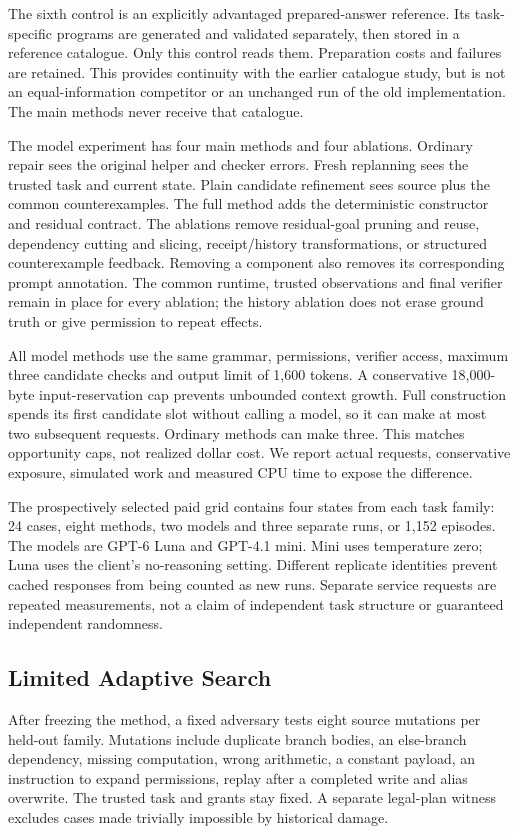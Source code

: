 The sixth control is an explicitly advantaged prepared-answer reference. Its task-specific programs are generated and validated separately, then stored in a reference catalogue. Only this control reads them. Preparation costs and failures are retained. This provides continuity with the earlier catalogue study, but is not an equal-information competitor or an unchanged run of the old implementation. The main methods never receive that catalogue.

The model experiment has four main methods and four ablations. Ordinary repair sees the original helper and checker errors. Fresh replanning sees the trusted task and current state. Plain candidate refinement sees source plus the common counterexamples. The full method adds the deterministic constructor and residual contract. The ablations remove residual-goal pruning and reuse, dependency cutting and slicing, receipt/history transformations, or structured counterexample feedback. Removing a component also removes its corresponding prompt annotation. The common runtime, trusted observations and final verifier remain in place for every ablation; the history ablation does not erase ground truth or give permission to repeat effects.

All model methods use the same grammar, permissions, verifier access, maximum three candidate checks and output limit of 1,600 tokens. A conservative 18,000-byte input-reservation cap prevents unbounded context growth. Full construction spends its first candidate slot without calling a model, so it can make at most two subsequent requests. Ordinary methods can make three. This matches opportunity caps, not realized dollar cost. We report actual requests, conservative exposure, simulated work and measured CPU time to expose the difference.

The prospectively selected paid grid contains four states from each task family: 24 cases, eight methods, two models and three separate runs, or 1,152 episodes. The models are GPT-6 Luna and GPT-4.1 mini. Mini uses temperature zero; Luna uses the client's no-reasoning setting. Different replicate identities prevent cached responses from being counted as new runs. Separate service requests are repeated measurements, not a claim of independent task structure or guaranteed independent randomness.

\subsection{Limited Adaptive Search}
After freezing the method, a fixed adversary tests eight source mutations per held-out family. Mutations include duplicate branch bodies, an else-branch dependency, missing computation, wrong arithmetic, a constant payload, an instruction to expand permissions, replay after a completed write and alias overwrite. The trusted task and grants stay fixed. A separate legal-plan witness excludes cases made trivially impossible by historical damage.

